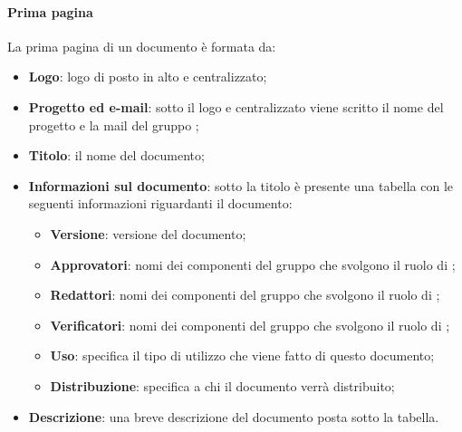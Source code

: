 \paragraph*{Prima pagina}
La prima pagina di un documento è formata da:
\begin{itemize}
	
	\item \textbf{Logo}: logo di \Gruppo{} posto in alto e centralizzato;
	
	\item \textbf{Progetto ed e-mail}: sotto il logo e centralizzato viene scritto il nome del progetto e la mail del gruppo \Gruppo{};
	
	\item \textbf{Titolo}: il nome del documento;
	
	\item \textbf{Informazioni sul documento}: sotto la titolo è presente una tabella con le seguenti informazioni riguardanti il documento:
	
	\begin{itemize}
		
		\item \textbf{Versione}: versione del documento;
		
		\item \textbf{Approvatori}: nomi dei componenti del gruppo che svolgono il ruolo di ;
		
		\item \textbf{Redattori}: nomi dei componenti del gruppo che svolgono il ruolo di ;
		
	 	\item \textbf{Verificatori}: nomi dei componenti del gruppo che svolgono il ruolo di ;
	 	
	 	\item \textbf{Uso}: specifica il tipo di utilizzo che viene fatto di questo documento;
	 	
	 	\item \textbf{Distribuzione}: specifica a chi il documento verrà distribuito;
	 	
	\end{itemize}
	
	\item \textbf{Descrizione}: una breve descrizione del documento posta sotto la tabella.
\end{itemize}

